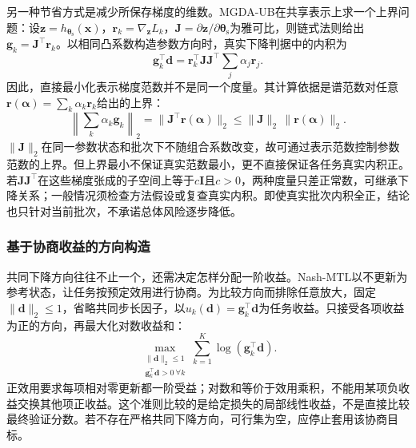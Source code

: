 另一种节省方式是减少所保存梯度的维数。MGDA-UB在共享表示上求一个上界问题：设$\bm z=h_{\bm{\theta}_{\mathrm s}}(\bm x)$，$\bm r_k=\nabla_{\bm z}L_k$，$\bm J=\partial\bm z/\partial\bm{\theta}_{\mathrm s}$为雅可比，则链式法则给出$\bm g_k=\bm J^{\top}\bm r_k$。以相同凸系数构造参数方向时，真实下降判据中的内积为
\begin{equation}
  \bm g_k^{\top}\bm d
  =\bm r_k^{\top}\bm J\bm J^{\top}
    \sum_j\alpha_j\bm r_j.
  \label{eq:ket-sharing-mgda-feature-metric}
\end{equation}
因此，直接最小化表示梯度范数并不是同一个度量。其计算依据是谱范数对任意$\bm r(\bm\alpha)=\sum_k\alpha_k\bm r_k$给出的上界：
\[
  \left\|\sum_k\alpha_k\bm g_k\right\|_2
  =\|\bm J^\top\bm r(\bm\alpha)\|_2
  \leq\|\bm J\|_2\,\|\bm r(\bm\alpha)\|_2.
\]
$\|\bm J\|_2$在同一参数状态和批次下不随组合系数改变，故可通过表示范数控制参数范数的上界。但上界最小不保证真实范数最小，更不直接保证各任务真实内积正。若$\bm J\bm J^{\top}$在这些梯度张成的子空间上等于$c\bm I$且$c>0$，两种度量只差正常数，可继承下降关系；一般情况须检查方法假设或复查真实内积。即使真实批次内积全正，结论也只针对当前批次，不承诺总体风险逐步降低。

\subsubsection{基于协商收益的方向构造}
\label{sec:ket-sharing-nash}

共同下降方向往往不止一个，还需决定怎样分配一阶收益。Nash-MTL以不更新为参考状态，让任务按预定效用进行协商。为比较方向而排除任意放大，固定$\|\bm d\|_2\leq1$，省略共同步长因子，以$u_k(\bm d)=\bm g_k^{\top}\bm d$为任务收益。只接受各项收益为正的方向，再最大化对数收益和：
\begin{equation}
  \max_{\substack{\|\bm d\|_2\leq1\\
                  \bm g_k^{\top}\bm d>0\ \forall k}}
  \sum_{k=1}^{K}\log(\bm g_k^{\top}\bm d).
  \label{eq:ket-sharing-nash-objective}
\end{equation}
正效用要求每项相对零更新都一阶受益；对数和等价于效用乘积，不能用某项负收益交换其他项正收益。这个准则比较的是给定损失的局部线性收益，不是直接比较最终验证分数。若不存在严格共同下降方向，可行集为空，应停止套用该协商目标。

